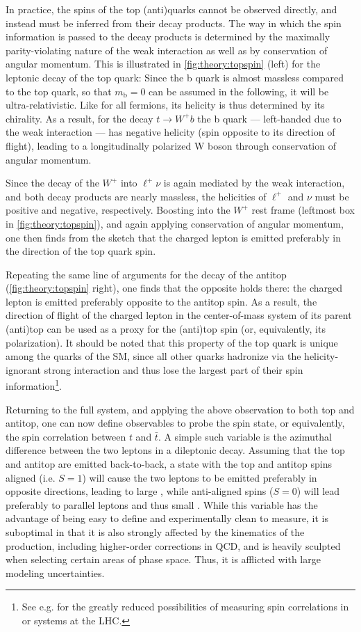 In practice, the spins of the top (anti)quarks cannot be observed directly, and instead must be inferred from their decay products. The way in which the spin information is passed to the decay products is determined by the maximally parity-violating nature of the weak interaction as well as by conservation of angular momentum. This is illustrated in \cref{fig:theory:topspin} (left) for the leptonic decay of the top quark: Since the b quark is almost massless compared to the top quark, so that $m_{\mathrm{b}} = 0$ can be assumed in the following, it will be ultra-relativistic. Like for all fermions, its helicity is thus determined by its chirality. As a result, for the decay $t \rightarrow W^+ b$ the b quark --- left-handed due to the weak interaction --- has negative helicity (spin opposite to its direction of flight), leading to a longitudinally polarized W boson through conservation of angular momentum.

Since the decay of the $W^+$ into $\ell^+ \nu$ is again mediated by the weak interaction, and both decay products are nearly massless, the helicities of $\ell^+$ and $\nu$ must be positive and negative, respectively. Boosting into the $W^+$ rest frame (leftmost box in \cref{fig:theory:topspin}), and again applying conservation of angular momentum, one then finds from the sketch that the charged lepton is emitted preferably in the direction of the top quark spin. 

Repeating the same line of arguments for the decay of the antitop (\cref{fig:theory:topspin} right), one finds that the opposite holds there: the charged lepton is emitted preferably opposite to the antitop spin. As a result, the direction of flight of the charged lepton in the center-of-mass system of its parent (anti)top can be used as a proxy for the (anti)top spin (or, equivalently, its polarization). It should be noted that this property of the top quark is unique among the quarks of the SM, since all other quarks hadronize via the helicity-ignorant strong interaction and thus lose the largest part of their spin information\footnote{See e.g.  for the greatly reduced possibilities of measuring spin correlations in \bbbar or \ccbar systems at the LHC.}.

Returning to the full \ttbar system, and applying the above observation to both top and antitop, one can now define observables to probe the \ttbar spin state, or equivalently, the spin correlation between $t$ and $\bar{t}$. A simple such variable is the azimuthal difference \dphill between the two leptons in a dileptonic decay. Assuming that the top and antitop are emitted back-to-back, a state with the top and antitop spins aligned (i.e. $S=1$) will cause the two leptons to be emitted preferably in opposite directions, leading to large \dphill, while anti-aligned spins ($S=0$) will lead preferably to parallel leptons and thus small \dphill. While this variable has the advantage of being easy to define and experimentally clean to measure, it is suboptimal in that it is also strongly affected by the kinematics of the \ttbar production, including higher-order corrections in QCD, and is heavily sculpted when selecting certain areas of \ttbar phase space. Thus, it is afflicted with large modeling uncertainties.

